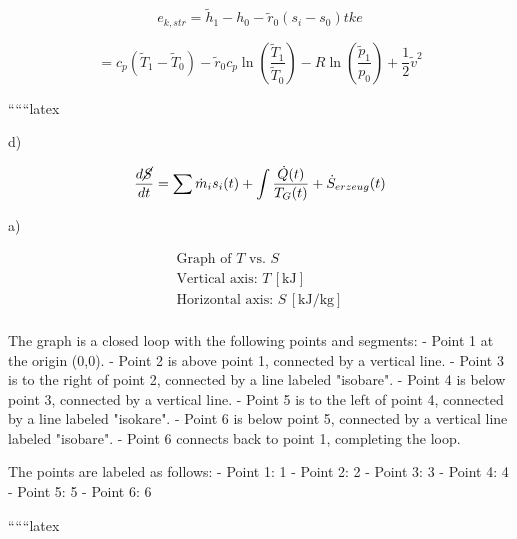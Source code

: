 \begin{equation*}
e_{k, str} = \tilde{h}_1 - h_0 - \tilde{r}_0 (s_i - s_0) tke
\end{equation*}

\begin{equation*}
= c_p (\tilde{T}_1 - \tilde{T}_0) - \tilde{r}_0 c_p \ln \left( \frac{\tilde{T}_1}{\tilde{T}_0} \right) - R \ln \left( \frac{\tilde{p}_1}{p_0} \right) + \frac{1}{2} \tilde{v}^2
\end{equation*}

``````latex


d)

\[
\frac{d\cancel{S}}{dt} = \sum \dot{m}_i s_i(t) + \int \frac{\dot{Q}(t)}{T_G(t)} + \dot{S}_{erzeug}(t)
\]

a)

\[
\begin{array}{c}
\text{Graph of } T \text{ vs. } S \\
\text{Vertical axis: } T \, [\text{kJ}] \\
\text{Horizontal axis: } S \, [\text{kJ/kg}] \\
\end{array}
\]

The graph is a closed loop with the following points and segments:
- Point 1 at the origin (0,0).
- Point 2 is above point 1, connected by a vertical line.
- Point 3 is to the right of point 2, connected by a line labeled "isobare".
- Point 4 is below point 3, connected by a vertical line.
- Point 5 is to the left of point 4, connected by a line labeled "isokare".
- Point 6 is below point 5, connected by a vertical line labeled "isobare".
- Point 6 connects back to point 1, completing the loop.

The points are labeled as follows:
- Point 1: 1
- Point 2: 2
- Point 3: 3
- Point 4: 4
- Point 5: 5
- Point 6: 6

``````latex


